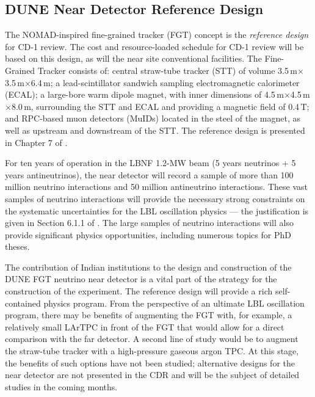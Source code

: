 \subsection{DUNE Near Detector Reference Design }

The NOMAD-inspired fine-grained tracker (FGT) concept is the \textit{reference 
design} for CD-1 review. The cost and resource-loaded schedule for CD-1 review 
will be based on this design, as will the near site conventional facilities. The 
Fine-Grained Tracker consists of:  central straw-tube tracker (STT) of volume 
3.5\,m$\times$3.5\,m$\times$6.4\,m; a lead-scintillator sandwich sampling electromagnetic calorimeter 
(ECAL); a large-bore warm dipole magnet, with inner dimensions of 
4.5\,m$\times$4.5\,m$\times$8.0\,m, surrounding the STT and ECAL and providing a magnetic field of 0.4\,T; 
and RPC-based muon detectors (MuIDs) located in the steel of the magnet, as well 
as upstream and downstream of the STT. The reference 
design is presented in Chapter 
7 of \voldune. 

For ten years of operation in the LBNF 1.2-MW beam (5 years neutrinos + 5 years 
antineutrinos), the near detector will record a sample of more than 100 million 
neutrino interactions and 50 million antineutrino interactions. These vast samples 
of neutrino interactions will provide the necessary strong constraints on the 
systematic uncertainties for the LBL oscillation physics --- the justification is 
given in Section 6.1.1 of \volphys. The large samples of neutrino 
interactions will also provide significant physics opportunities, including 
numerous topics for PhD theses.  


The contribution of Indian institutions to the design and construction of the DUNE 
FGT neutrino near detector is a vital part of the strategy for the construction 
of the experiment. The reference design will provide a rich self-contained physics 
program. From the perspective of an ultimate LBL oscillation program, there may 
be benefits of augmenting the FGT with, for example, a relatively small LArTPC 
in front of the FGT that would allow for a direct comparison with the far detector. 
A second line of study would be to augment the straw-tube tracker  with 
a high-pressure gaseous argon TPC. At this stage, the benefits of such options 
have not been studied; alternative designs for the near detector are not presented in 
the CDR and will be the subject of detailed studies in the coming months. 

